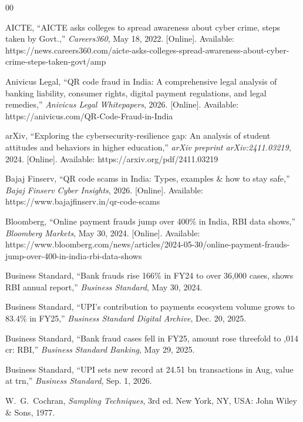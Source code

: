 \documentclass[journal,10pt,twocolumn]{IEEEtran}
\begin{document}
\begin{thebibliography}{00}

 AICTE, ``AICTE asks colleges to spread awareness about cyber crime, steps taken by Govt.,'' \textit{Careers360}, May 18, 2022. [Online]. Available: https://news.careers360.com/aicte-asks-colleges-spread-awareness-about-cyber-crime-steps-taken-govt/amp

 Anivicus Legal, ``QR code fraud in India: A comprehensive legal analysis of banking liability, consumer rights, digital payment regulations, and legal remedies,'' \textit{Anivicus Legal Whitepapers}, 2026. [Online]. Available: https://anivicus.com/QR-Code-Fraud-in-India

 arXiv, ``Exploring the cybersecurity-resilience gap: An analysis of student attitudes and behaviors in higher education,'' \textit{arXiv preprint arXiv:2411.03219}, 2024. [Online]. Available: https://arxiv.org/pdf/2411.03219

 Bajaj Finserv, ``QR code scams in India: Types, examples \& how to stay safe,'' \textit{Bajaj Finserv Cyber Insights}, 2026. [Online]. Available: https://www.bajajfinserv.in/qr-code-scams

 Bloomberg, ``Online payment frauds jump over 400\% in India, RBI data shows,'' \textit{Bloomberg Markets}, May 30, 2024. [Online]. Available: https://www.bloomberg.com/news/articles/2024-05-30/online-payment-frauds-jump-over-400-in-india-rbi-data-shows

 Business Standard, ``Bank frauds rise 166\% in FY24 to over 36,000 cases, shows RBI annual report,'' \textit{Business Standard}, May 30, 2024.

 Business Standard, ``UPI's contribution to payments ecosystem volume grows to 83.4\% in FY25,'' \textit{Business Standard Digital Archive}, Dec. 20, 2025.

 Business Standard, ``Bank fraud cases fell in FY25, amount rose threefold to ,014 cr: RBI,'' \textit{Business Standard Banking}, May 29, 2025.

 Business Standard, ``UPI sets new record at 24.51 bn transactions in Aug, value at  trn,'' \textit{Business Standard}, Sep. 1, 2026.

 W.~G.~Cochran, \textit{Sampling Techniques}, 3rd ed. New York, NY, USA: John Wiley \& Sons, 1977.


\end{thebibliography}
\end{document}
